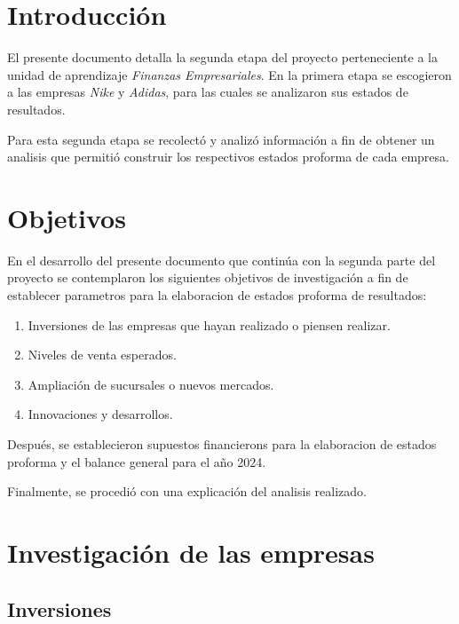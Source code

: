 \documentclass[a4paper,12pt]{article}
\begin{document}
\newpage

\tableofcontents

\newpage


\section{Introducción}

El presente documento detalla la segunda etapa del proyecto perteneciente a la unidad de aprendizaje \emph{Finanzas Empresariales}. En la primera etapa se escogieron a las empresas \emph{Nike} y \emph{Adidas}, para las cuales se analizaron sus estados de resultados.\par
Para esta segunda etapa se recolectó y analizó información a fin de obtener un analisis que permitió construir los respectivos estados proforma de cada empresa.\par

\section{Objetivos}
En el desarrollo del presente documento que continúa con la segunda parte del proyecto se contemplaron los siguientes objetivos de investigación a fin de establecer parametros para la elaboracion de estados proforma de resultados:

\begin{enumerate}
	\item Inversiones de las empresas que hayan realizado o piensen realizar.
	\item Niveles de venta esperados.
	\item Ampliación de sucursales o nuevos mercados.
	\item Innovaciones y desarrollos.
\end{enumerate}

Después, se establecieron supuestos financierons para la elaboracion de estados proforma y el balance general para el año 2024.\par

Finalmente, se procedió con una explicación del analisis realizado.

\clearpage

\section{Investigación de las empresas}

\subsection{Inversiones}
\end{document}
